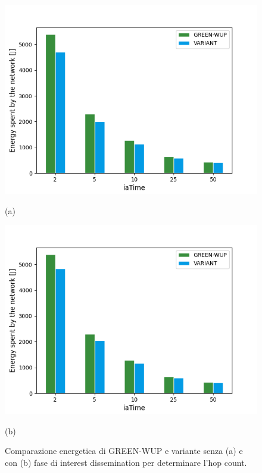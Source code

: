 \documentclass[binding=0.6cm,TFA]{sapthesis}
\begin{document}
\begin{figure}
    \centering
    \begin{minipage}{.5\textwidth}
        \centering
        \includegraphics[width=1\linewidth]{energy_plot.png}
        \caption*{(a)}
    \end{minipage}%
    \begin{minipage}{.5\textwidth}
        \centering
        \includegraphics[width=1\linewidth]{interest_energy_plot.png}
        \caption*{(b)}
    \end{minipage}
    \caption{Comparazione energetica di GREEN-WUP e variante senza (a) e con (b) fase di interest dissemination per determinare l'hop count.}
\end{figure}
\end{document}
